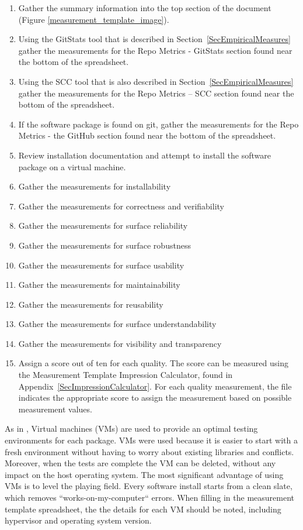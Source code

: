 \documentclass[letterpaper,cleveref]{lipics-v2019}
\begin{document}
\begin{enumerate}
\item Gather the summary information into the top section of the document
  (Figure \ref{measurement_template_image}).
\item Using the GitStats tool that is described in
  Section~\ref{SecEmpiricalMeasures} gather the measurements for the Repo
  Metrics - GitStats section found near the bottom of the spreadsheet.
\item Using the SCC tool that is also described in
  Section~\ref{SecEmpiricalMeasures} gather the measurements for the Repo
  Metrics -- SCC section found near the bottom of the spreadsheet.
\item If the software package is found on git, gather the measurements for the
  Repo Metrics - the GitHub section found near the bottom of the spreadsheet.
\item Review installation documentation and attempt to install the software
  package on a virtual machine.
\item Gather the measurements for installability
\item Gather the measurements for correctness and verifiability
\item Gather the measurements for surface reliability
\item Gather the measurements for surface robustness
\item Gather the measurements for surface usability
\item Gather the measurements for maintainability
\item Gather the measurements for reusability
\item Gather the measurements for surface understandability
\item Gather the measurements for visibility and transparency
\item Assign a score out of ten for each quality. The score can be measured
  using the Measurement Template Impression Calculator, found in
  Appendix~\ref{SecImpressionCalculator}. For each quality measurement, the file
  indicates the appropriate score to assign the measurement based on possible
  measurement values.
\end{enumerate}

As in \citet{SmithEtAl2016}, Virtual machines (VMs) are used to provide an
optimal testing environments for each package. VMs were used because it is
easier to start with a fresh environment without having to worry about existing
libraries and conflicts. Moreover, when the tests are complete the VM can be
deleted, without any impact on the host operating system. The most significant
advantage of using VMs is to level the playing field. Every software install
starts from a clean slate, which removes ``works-on-my-computer`` errors. When
filling in the measurement template spreadsheet, the the details for each VM
should be noted, including hypervisor and operating system version.
\end{document}
